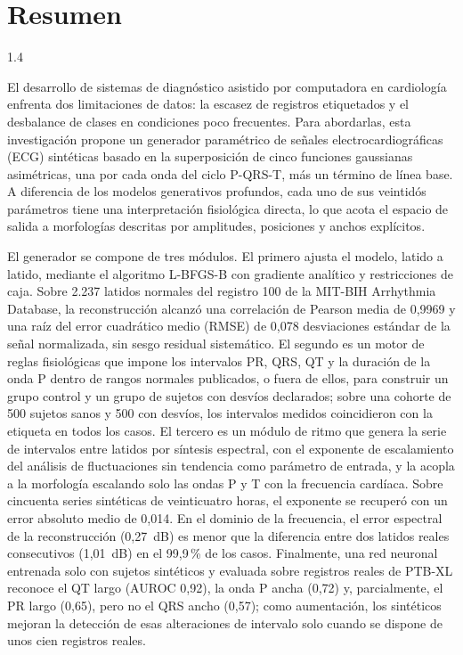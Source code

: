 \newpage
\section*{Resumen}
\begin{spacing}{1.4}

El desarrollo de sistemas de diagnóstico asistido por computadora en cardiología enfrenta dos limitaciones de datos: la escasez de registros etiquetados y el desbalance de clases en condiciones poco frecuentes. Para abordarlas, esta investigación propone un generador paramétrico de señales electrocardiográficas (ECG) sintéticas basado en la superposición de cinco funciones gaussianas asimétricas, una por cada onda del ciclo P-QRS-T, más un término de línea base. A diferencia de los modelos generativos profundos, cada uno de sus veintidós parámetros tiene una interpretación fisiológica directa, lo que acota el espacio de salida a morfologías descritas por amplitudes, posiciones y anchos explícitos.

El generador se compone de tres módulos. El primero ajusta el modelo, latido a latido, mediante el algoritmo L-BFGS-B con gradiente analítico y restricciones de caja. Sobre 2.237 latidos normales del registro 100 de la MIT-BIH Arrhythmia Database, la reconstrucción alcanzó una correlación de Pearson media de 0,9969 y una raíz del error cuadrático medio (RMSE) de 0,078 desviaciones estándar de la señal normalizada, sin sesgo residual sistemático. El segundo es un motor de reglas fisiológicas que impone los intervalos PR, QRS, QT y la duración de la onda P dentro de rangos normales publicados, o fuera de ellos, para construir un grupo control y un grupo de sujetos con desvíos declarados; sobre una cohorte de 500 sujetos sanos y 500 con desvíos, los intervalos medidos coincidieron con la etiqueta en todos los casos. El tercero es un módulo de ritmo que genera la serie de intervalos entre latidos por síntesis espectral, con el exponente de escalamiento del análisis de fluctuaciones sin tendencia como parámetro de entrada, y la acopla a la morfología escalando solo las ondas P y T con la frecuencia cardíaca. Sobre cincuenta series sintéticas de veinticuatro horas, el exponente se recuperó con un error absoluto medio de 0,014. En el dominio de la frecuencia, el error espectral de la reconstrucción (0,27~dB) es menor que la diferencia entre dos latidos reales consecutivos (1,01~dB) en el 99,9\,\% de los casos. Finalmente, una red neuronal entrenada solo con sujetos sintéticos y evaluada sobre registros reales de PTB-XL reconoce el QT largo (AUROC 0,92), la onda P ancha (0,72) y, parcialmente, el PR largo (0,65), pero no el QRS ancho (0,57); como aumentación, los sintéticos mejoran la detección de esas alteraciones de intervalo solo cuando se dispone de unos cien registros reales.


\end{spacing}
